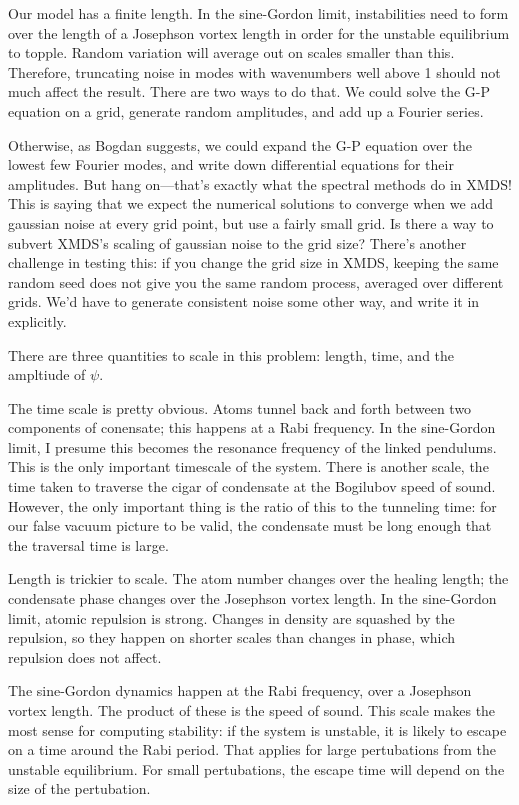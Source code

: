 Our model has a finite length.  In the sine-Gordon limit, instabilities need to form over the length of a Josephson vortex length in order for the unstable equilibrium to topple.  Random variation will average out on scales smaller than this.  Therefore, truncating noise in modes with wavenumbers well above 1 should not much affect the result.  There are two ways to do that.  We could solve the G-P equation on a grid, generate random amplitudes, and add up a Fourier series.

Otherwise, as Bogdan suggests, we could expand the G-P equation over the lowest few Fourier modes, and write down differential equations for their amplitudes.  But hang on—that's exactly what the spectral methods do in XMDS!  This is saying that we expect the numerical solutions to converge when we add gaussian noise at every grid point, but use a fairly small grid.  Is there a way to subvert XMDS's scaling of gaussian noise to the grid size?  There's another challenge in testing this: if you change the grid size in XMDS, keeping the same random seed does not give you the same random process, averaged over different grids.  We'd have to generate consistent noise some other way, and write it in explicitly.



There are three quantities to scale in this problem: length, time, and the ampltiude of $ψ$.

The time scale is pretty obvious.  Atoms tunnel back and forth between two components of conensate; this happens at a Rabi frequency.  In the sine-Gordon limit, I presume this becomes the resonance frequency of the linked pendulums.  This is the only important timescale of the system.  There is another scale, the time taken to traverse the cigar of condensate at the Bogilubov speed of sound.  However, the only important thing is the ratio of this to the tunneling time: for our false vacuum picture to be valid, the condensate must be long enough that the traversal time is large.

Length is trickier to scale.  The atom number changes over the healing length; the condensate phase changes over the Josephson vortex length.  In the sine-Gordon limit, atomic repulsion is strong.  Changes in density are squashed by the repulsion, so they happen on shorter scales than changes in phase, which repulsion does not affect.

The sine-Gordon dynamics happen at the Rabi frequency, over a Josephson vortex length.  The product of these is the speed of sound.  This scale makes the most sense for computing stability: if the system is unstable, it is likely to escape on a time around the Rabi period.  That applies for large pertubations from the unstable equilibrium.  For small pertubations, the escape time will depend on the size of the pertubation.

